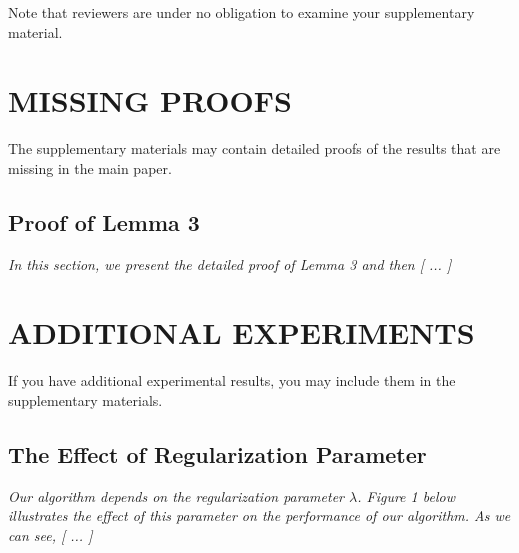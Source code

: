 \documentclass[twoside]{article}
\begin{document}
Note that reviewers are under no obligation to examine your supplementary material.

\section{MISSING PROOFS}

The supplementary materials may contain detailed proofs of the results that are missing in the main paper.

\subsection{Proof of Lemma 3}

\textit{In this section, we present the detailed proof of Lemma 3 and then [ ... ]}

\section{ADDITIONAL EXPERIMENTS}

If you have additional experimental results, you may include them in the supplementary materials.

\subsection{The Effect of Regularization Parameter}

\textit{Our algorithm depends on the regularization parameter $\lambda$. Figure 1 below illustrates the effect of this parameter on the performance of our algorithm. As we can see, [ ... ]}

\vfill
\end{document}
